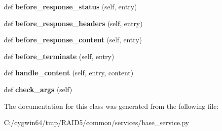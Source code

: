 \begin{DoxyCompactItemize}
def {\bfseries before\+\_\+response\+\_\+status} (self, entry)
\item 
\mbox{\label{class_r_a_i_d5_1_1common_1_1services_1_1base__service_1_1_base_service_ac663ae59366946ff7f563d085e1768ee}} 
def {\bfseries before\+\_\+response\+\_\+headers} (self, entry)
\item 
\mbox{\label{class_r_a_i_d5_1_1common_1_1services_1_1base__service_1_1_base_service_a0cecdf1a50fd3247ec3825b640b9c7f9}} 
def {\bfseries before\+\_\+response\+\_\+content} (self, entry)
\item 
\mbox{\label{class_r_a_i_d5_1_1common_1_1services_1_1base__service_1_1_base_service_ac7968b7b3eca3dbb305cd2ce0699bd6c}} 
def {\bfseries before\+\_\+terminate} (self, entry)
\item 
\mbox{\label{class_r_a_i_d5_1_1common_1_1services_1_1base__service_1_1_base_service_a15d861d706c6dd6f70d5c0d466505819}} 
def {\bfseries handle\+\_\+content} (self, entry, content)
\item 
\mbox{\label{class_r_a_i_d5_1_1common_1_1services_1_1base__service_1_1_base_service_ac56cc0a2744e53809e4903a8d48f089e}} 
def {\bfseries check\+\_\+args} (self)
\end{DoxyCompactItemize}


The documentation for this class was generated from the following file\+:\begin{DoxyCompactItemize}
\item 
C\+:/cygwin64/tmp/\+R\+A\+I\+D5/common/services/base\+\_\+service.\+py\end{DoxyCompactItemize}
